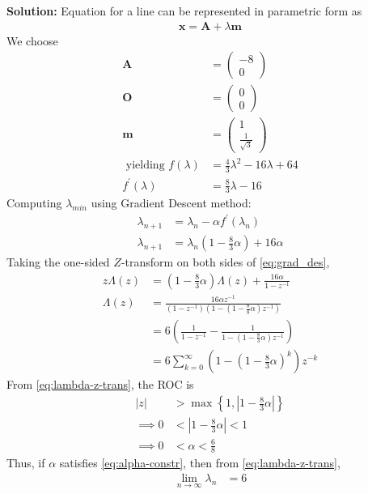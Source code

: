 \documentclass[12pt]{article}
\providecommand{\brak}[1]{\ensuremath{\left(#1\right)}}
\providecommand{\cbrak}[1]{\ensuremath{\left\{#1\right\}}}
\providecommand{\abs}[1]{\left\vert#1\right\vert}
\newcommand{\solution}{\noindent \textbf{Solution: }}
\newcommand{\myvec}[1]{\ensuremath{\begin{pmatrix}#1\end{pmatrix}}}
\let\vec\mathbf
\begin{document}
\begin{enumerate}
\solution 
Equation for a line  can be represented in parametric form as
\begin{align}
	\label{eq:Eq2}
	\vec{x} = \vec{A}+\lambda\vec{m}
\end{align}
We choose  
\begin{align}
	\vec{A} &= \myvec{-8 \\ 0}\\
	\vec{O} &= \myvec{ 0 \\ 0} \\
	\vec{m} &= \myvec{1 \\ \frac{1}{\sqrt{3}}} \\
	\text{ yielding }\label{eq:Eq6}
	f\brak{\lambda} &= \frac{4}{3}\lambda^2-16\lambda+64 \\ 
	f^\prime\brak{\lambda} &= \frac{8}{3}\lambda - 16
\end{align}
Computing $\lambda_{min}$ using Gradient Descent method:
\begin{align}
	\lambda_{n+1} &= \lambda_n - \alpha f^\prime\brak{\lambda_n}\\
	\label{eq:grad_des}
	\lambda_{n+1} &= \lambda_n\brak{1-\frac{8}{3}\alpha} + 16\alpha
\end{align}
Taking the one-sided $Z$-transform on both sides of \eqref{eq:grad_des},
\begin{align}
            \label{eq:Z-trans-eqn}
	    z\Lambda\brak{z} &= \brak{1-\frac{8}{3}\alpha}\Lambda\brak{z} + \frac{16\alpha}{1-z^{-1}} \\
	    \Lambda\brak{z} &= \frac{16\alpha z^{-1}}{\brak{1-z^{-1}}\brak{1-\brak{1-\frac{8}{8}\alpha}z^{-1}}} \\
	    &= 6\brak{ \frac{1}{1-z^{-1}} - \frac{1}{1-\brak{1-\frac{8}{3}\alpha}z^{-1}}} \\
            \label{eq:lambda-z-trans}
	    &= 6\sum_{k=0}^{\infty}\brak{1-\brak{1-\frac{8}{3}\alpha}^k}z^{-k}
\end{align}
From \eqref{eq:lambda-z-trans}, the ROC is
\begin{align}
	\abs{z} &> \max\cbrak{1,\abs{1-\frac{8}{3}\alpha}} \\
	\implies 0 & < \abs{1-\frac{8}{3}\alpha} < 1 \\
        \label{eq:alpha-constr}
        \implies 0 &< \alpha < \frac{6}{8}
\end{align}
Thus, if $\alpha$ satisfies \eqref{eq:alpha-constr}, then from \eqref{eq:lambda-z-trans}, 
\begin{align}
	\label{eq:conv}
        \lim_{n\to\infty}\lambda_n &= 6 
    \end{align}

\end{enumerate}
\end{document}
